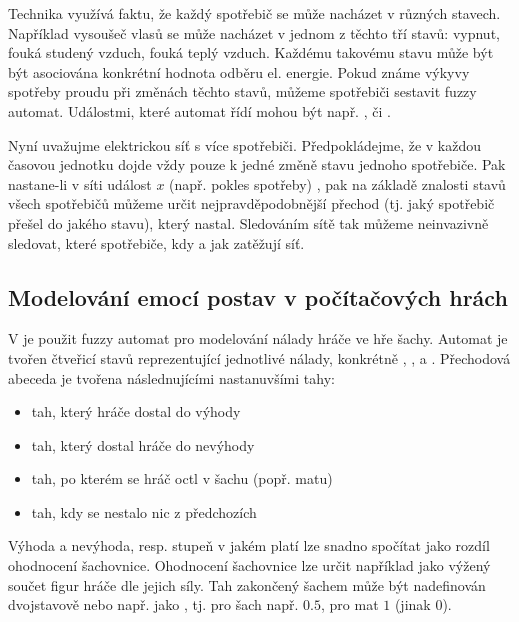 \documentclass[a4paper,10pt]{article}
\begin{document}
Technika využívá faktu, že každý spotřebič se může nacházet v různých stavech. Například vysoušeč vlasů se může nacházet v jednom z těchto tří stavů: vypnut, fouká studený vzduch, fouká teplý vzduch. Každému takovému stavu může být být asociována konkrétní hodnota odběru el. energie.  Pokud známe výkyvy spotřeby proudu při změnách těchto stavů, můžeme spotřebiči sestavit fuzzy automat. Událostmi, které automat řídí mohou být  např. ,  či . 

Nyní uvažujme elektrickou síť s více spotřebiči. Předpokládejme, že v každou časovou jednotku dojde vždy pouze k jedné změně stavu jednoho spotřebiče. Pak nastane-li v síti událost $x$ (např. pokles spotřeby) , pak na základě znalosti stavů všech spotřebičů můžeme určit nejpravděpodobnější přechod (tj. jaký spotřebič přešel do jakého stavu), který nastal. Sledováním sítě tak můžeme neinvazivně sledovat, které spotřebiče, kdy a jak zatěžují síť.

\subsection{Modelování emocí postav v počítačových hrách}
V \cite{AlvJoaCru-FuStMaAppEmoModEleGamCha} je použit fuzzy automat pro modelování nálady hráče ve hře šachy. Automat je tvořen čtveřicí stavů reprezentující jednotlivé  nálady, konkrétně , ,  a . Přechodová abeceda je tvořena následnujícími nastanuvšími tahy:
\begin{itemize}
 \item tah, který hráče dostal do výhody
 \item tah, který dostal hráče do nevýhody
 \item tah, po kterém se hráč octl v šachu (popř. matu)
 \item tah, kdy se nestalo nic z předchozích
\end{itemize}
Výhoda a nevýhoda, resp. stupeň v jakém platí  lze snadno spočítat jako rozdíl ohodnocení šachovnice. Ohodnocení šachovnice lze určit například jako výžený součet figur hráče dle jejich síly. Tah zakončený šachem může být nadefinován dvojstavově nebo např. jako , tj. pro šach např. $0.5$, pro mat $1$ (jinak $0$).
\end{document}
